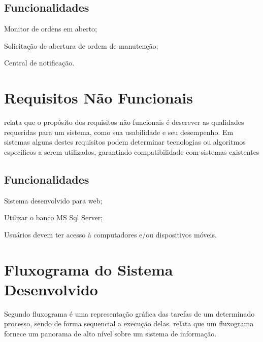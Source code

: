 \subsection{Funcionalidades}
\begin{subalineas}
	\item {Monitor de ordens em aberto};
	\item {Solicitação de abertura de ordem de manutenção};
	\item {Central de notificação}.
\end{subalineas}

\section{Requisitos Não Funcionais}

{\cite{IIBA2005} relata que o propósito dos requisitos não funcionais é descrever as qualidades requeridas para um sistema, como sua usabilidade e seu desempenho. Em sistemas alguns destes requisitos podem determinar tecnologias ou algoritmos específicos a serem utilizados, garantindo compatibilidade com sistemas existentes \cite{cordeiro2007}

\subsection{Funcionalidades}
\begin{subalineas}
	\item {Sistema desenvolvido para web};
	\item {Utilizar o banco MS Sql Server};
	\item {Usuários devem ter acesso à computadores e/ou dispositivos móveis}.
\end{subalineas}

\section{Fluxograma do Sistema Desenvolvido}

{Segundo \cite{pejeronimo2002} fluxograma é uma representação gráfica das tarefas de um determinado processo, sendo de forma sequencial a execução delas. \cite{roberthurt} relata que um fluxograma fornece um panorama de alto nível sobre um sistema de informação.

}}
